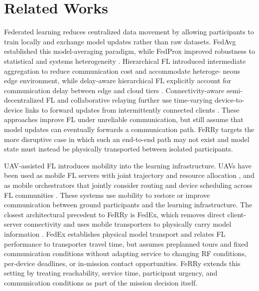 \documentclass[conference]{IEEEtran}
\newcommand{\sysname}{FeRRy}
\begin{document}
\section{Related Works}
\label{sec:related_works}
Federated learning reduces centralized data movement by allowing participants
to train locally and exchange model updates rather than raw datasets. FedAvg
established this model-averaging paradigm, while FedProx improved robustness to
statistical and systems heterogeneity
\cite{mcmahan2017communication,li2020federated}. Hierarchical FL
introduced intermediate aggregation to reduce communication cost and accommodate heteroge-
neous edge environment, while delay-aware hierarchical FL explicitly
account for communication delay between edge and cloud tiers
\cite{liu2020client,lin2023delay}. Connectivity-aware semi-decentralized FL and
collaborative relaying further use time-varying device-to-device links to
forward updates from intermittently connected clients
\cite{parasnis2023connectivity,yemini2023robust}. These approaches improve FL
under unreliable communication, but still assume that model updates can
eventually forwards a communication path.  \sysname{} targets the more disruptive case in which such an end-to-end path may not exist and model state must instead be physically transported between isolated participants.


UAV-assisted FL introduces mobility into the learning infrastructure. UAVs have
been used as mobile FL servers with joint trajectory and resource allocation
\cite{zhang2025latency}, and as mobile orchestrators that jointly consider
routing and device scheduling across FL communities
\cite{mestoukirdi2022uav}. These systems use mobility to restore or improve communication between ground participants and the learning infrastructure.  The closest architectural precedent to \sysname{} is
FedEx, which removes direct client-server connectivity and uses mobile
transporters to physically carry model information
\cite{bian2025indirect}. FedEx establishes physical model transport and relates FL performance to transporter travel time, but assumes preplanned tours and fixed communication conditions without adapting service to changing RF conditions, per-device deadlines, or in-mission contact opportunities. \sysname{} extends this setting by treating reachability, service time, participant urgency, and communication conditions as part of the mission decision itself.
\end{document}
